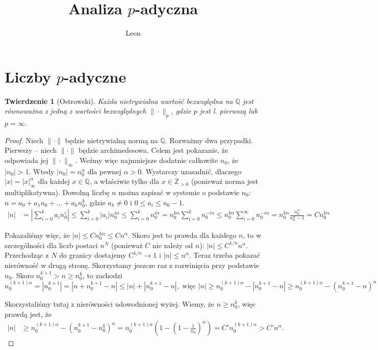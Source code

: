 \documentclass[a4paper, twoside]{extarticle}
\author{Leon}
\title{Analiza $p$-adyczna}
\newcommand{\Q}{\mathbb{Q}}
\newcommand{\Z}{\mathbb{Z}}
\newcommand{\n}{\|\cdot\|}
\newtheorem{mojetw}{Twierdzenie}
\begin{document}
 
\maketitle
\tableofcontents

\section{Liczby $p$-adyczne}
\begin{mojetw}[Ostrowski]
Każda nietrywialna wartość bezwzględna na $\Q$ jest równoważna z jedną z wartości bezwzględnych $\|\cdot\|_p$, gdzie $p$ jest l. pierwszą lub $p = \infty$.
\end{mojetw}

\begin{proof}
Niech $\n$ będzie nietrywialną normą na $\Q$.
Rozważmy dwa przypadki.
Pierwszy -- niech $\n$ będzie archimedesowa.
Celem jest pokazanie, że odpowiada jej $\n_\infty$.
Weźmy więc najmniejsze dodatnie całkowite $n_0$, że $|n_0| > 1$.
Wtedy $|n_0| = n_0^\alpha$ dla pewnej $\alpha > 0$.
Wystarczy uzasadnić, dlaczego $|x| = |x|_\infty^\alpha$ dla każdej $x \in \Q$, a właściwie tylko dla $x \in \Z_{>0}$ (ponieważ norma jest multiplikatywna).
Dowolną liczbę $n$ można zapisać w systemie o podstawie $n_0$: $n = a_0 + a_1 n_0 + \dots + a_kn_0^k$, gdzie $a_k \neq 0$ i $0 \le a_i \le n_0-1$.
\begin{align*}
|n| & = \left|\sum_{i=0}^k a_in_0^i\right| \le \sum_{i=0}^k \left|a_i\right| n_0^{i \alpha} \le \sum_{i=0}^k n_0^{i \alpha} = n_0^{k \alpha} \sum_{i = 0}^k n_0^{-i \alpha} \le n_0^{k \alpha} \sum_{i = 0}^\infty n_0^{-i \alpha} = n_0^{k \alpha} \frac{n_0^\alpha}{n_0^\alpha - 1} = C n_0^{k \alpha}
\end{align*}

Pokazaliśmy więc, że $|n| \le Cn_0^{k \alpha} \le C n^\alpha$.
Skoro jest to prawda dla każdego $n$, to w szczególności dla liczb postaci $n^N$ (ponieważ $C$ nie zależy od $n$): $|n| \le C^{1/n}n^\alpha$.
Przechodząc z $N$ do granicy dostajemy $C^{1/n} \to 1$ i $|n| \le n^\alpha$.
Teraz trzeba pokazać nierówność w drugą stronę.
Skorzystamy jeszcze raz z rozwinięcia przy podstawie $n_0$.
Skoro $n_0^{k+1} > n \ge n_0^k$, to zachodzi
\[n_0^{(k+1) \alpha} = |n_0^{k+1}| = |n+n_0^{k+1} - n| \le |n| + |n_0^{k+1} - n|, \text{ więc } |n| \ge n_0^{(k+1)\alpha} - |n_0^{k+1} -n| \ge n_0^{(k+1)\alpha} - (n_0^{k+1} -n)^\alpha\]

Skorzystaliśmy tutaj z nierówności udowodnionej wyżej.
Wiemy, że $n \ge n_0^k$, więc prawdą jest, że
\begin{align*}
|n| & \ge n_0^{(k+1)\alpha} - (n_0^{k+1} - n_0^k)^\alpha = n_0^{(k+1) \alpha} \left(1 - \left(1 - \frac{1}{n_0}\right)^\alpha\right) = C' n_0^{(k+1)\alpha} > C' n^\alpha.
\end{align*}


\end{proof}
\end{document}
